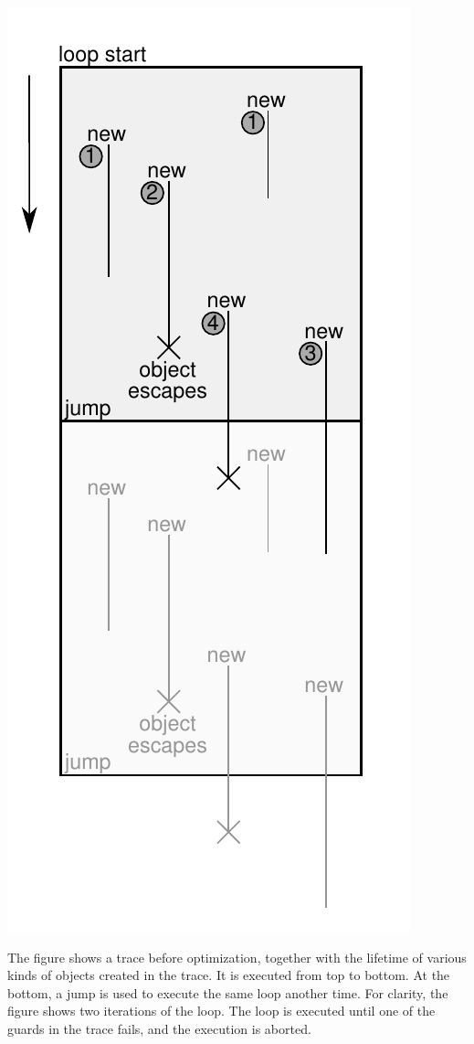 \documentclass{sigplanconf}
\begin{document}
\includegraphics{figures/obj-lifetime.pdf}

The figure shows a trace before optimization, together with the lifetime of
various kinds of objects created in the trace. It is executed from top to
bottom. At the bottom, a jump is used to execute the same loop another time.
For clarity, the figure shows two iterations of the loop.
The loop is executed until one of the guards in the trace fails, and the
execution is aborted.
\end{document}
